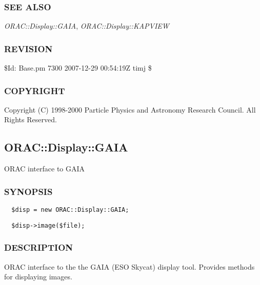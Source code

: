 \subsubsection*{SEE ALSO\label{ORAC::Display::Base_SEE_ALSO}}


\emph{ORAC::Display::GAIA}, \emph{ORAC::Display::KAPVIEW}

\subsubsection*{REVISION\label{ORAC::Display::Base_REVISION}}


\$Id: Base.pm 7300 2007-12-29 00:54:19Z timj \$

\subsubsection*{COPYRIGHT\label{ORAC::Display::Base_COPYRIGHT}}


Copyright (C) 1998-2000 Particle Physics and Astronomy Research
Council. All Rights Reserved.

\subsection{ORAC::Display::GAIA\label{ORAC::Display::GAIA}}


ORAC interface to GAIA

\subsubsection*{SYNOPSIS\label{ORAC::Display::GAIA_SYNOPSIS}}
\begin{verbatim}
  $disp = new ORAC::Display::GAIA;
\end{verbatim}
\begin{verbatim}
  $disp->image($file);
\end{verbatim}
\subsubsection*{DESCRIPTION\label{ORAC::Display::GAIA_DESCRIPTION}}


ORAC interface to the the GAIA (ESO Skycat) display tool. Provides methods
for displaying images.



